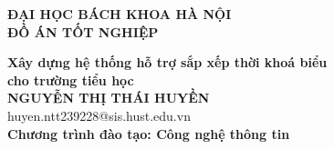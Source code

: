 \documentclass[DoAn.tex]{subfiles}
\begin{document}
\begin{titlepage}
\thispagestyle{empty}
\begin{center}

{\textbf{\large{ĐẠI HỌC BÁCH KHOA HÀ NỘI}}}\\[4cm]

{\textbf{\huge{ĐỒ ÁN TỐT NGHIỆP}}}\\[1cm]
{\textbf{\Large{Xây dựng hệ thống hỗ trợ sắp xếp thời khoá biểu\\cho trường tiểu học}}\\[1cm]

{\textbf{\large{NGUYỄN THỊ THÁI HUYỀN}}}\\
{\large{huyen.ntt239228@sis.hust.edu.vn}}\\[0.5cm]

{\textbf{\large{Chương trình đào tạo: Công nghệ thông tin
}}}\\

\vspace{4cm}
\begin{table}[H]
\centering
{}
\end{table}}
\end{center}



\end{titlepage}
\end{document}
